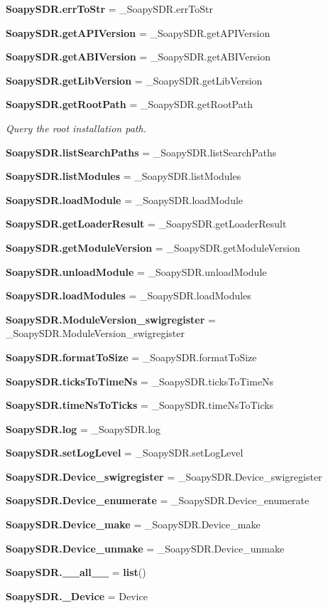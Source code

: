 \begin{DoxyCompactItemize}
{\bf Soapy\+S\+D\+R.\+err\+To\+Str} = \+\_\+\+Soapy\+S\+D\+R.\+err\+To\+Str
\item 
{\bf Soapy\+S\+D\+R.\+get\+A\+P\+I\+Version} = \+\_\+\+Soapy\+S\+D\+R.\+get\+A\+P\+I\+Version
\item 
{\bf Soapy\+S\+D\+R.\+get\+A\+B\+I\+Version} = \+\_\+\+Soapy\+S\+D\+R.\+get\+A\+B\+I\+Version
\item 
{\bf Soapy\+S\+D\+R.\+get\+Lib\+Version} = \+\_\+\+Soapy\+S\+D\+R.\+get\+Lib\+Version
\item 
{\bf Soapy\+S\+D\+R.\+get\+Root\+Path} = \+\_\+\+Soapy\+S\+D\+R.\+get\+Root\+Path
\begin{DoxyCompactList}\small\item\em Query the root installation path. \end{DoxyCompactList}\item 
{\bf Soapy\+S\+D\+R.\+list\+Search\+Paths} = \+\_\+\+Soapy\+S\+D\+R.\+list\+Search\+Paths
\item 
{\bf Soapy\+S\+D\+R.\+list\+Modules} = \+\_\+\+Soapy\+S\+D\+R.\+list\+Modules
\item 
{\bf Soapy\+S\+D\+R.\+load\+Module} = \+\_\+\+Soapy\+S\+D\+R.\+load\+Module
\item 
{\bf Soapy\+S\+D\+R.\+get\+Loader\+Result} = \+\_\+\+Soapy\+S\+D\+R.\+get\+Loader\+Result
\item 
{\bf Soapy\+S\+D\+R.\+get\+Module\+Version} = \+\_\+\+Soapy\+S\+D\+R.\+get\+Module\+Version
\item 
{\bf Soapy\+S\+D\+R.\+unload\+Module} = \+\_\+\+Soapy\+S\+D\+R.\+unload\+Module
\item 
{\bf Soapy\+S\+D\+R.\+load\+Modules} = \+\_\+\+Soapy\+S\+D\+R.\+load\+Modules
\item 
{\bf Soapy\+S\+D\+R.\+Module\+Version\+\_\+swigregister} = \+\_\+\+Soapy\+S\+D\+R.\+Module\+Version\+\_\+swigregister
\item 
{\bf Soapy\+S\+D\+R.\+format\+To\+Size} = \+\_\+\+Soapy\+S\+D\+R.\+format\+To\+Size
\item 
{\bf Soapy\+S\+D\+R.\+ticks\+To\+Time\+Ns} = \+\_\+\+Soapy\+S\+D\+R.\+ticks\+To\+Time\+Ns
\item 
{\bf Soapy\+S\+D\+R.\+time\+Ns\+To\+Ticks} = \+\_\+\+Soapy\+S\+D\+R.\+time\+Ns\+To\+Ticks
\item 
{\bf Soapy\+S\+D\+R.\+log} = \+\_\+\+Soapy\+S\+D\+R.\+log
\item 
{\bf Soapy\+S\+D\+R.\+set\+Log\+Level} = \+\_\+\+Soapy\+S\+D\+R.\+set\+Log\+Level
\item 
{\bf Soapy\+S\+D\+R.\+Device\+\_\+swigregister} = \+\_\+\+Soapy\+S\+D\+R.\+Device\+\_\+swigregister
\item 
{\bf Soapy\+S\+D\+R.\+Device\+\_\+enumerate} = \+\_\+\+Soapy\+S\+D\+R.\+Device\+\_\+enumerate
\item 
{\bf Soapy\+S\+D\+R.\+Device\+\_\+make} = \+\_\+\+Soapy\+S\+D\+R.\+Device\+\_\+make
\item 
{\bf Soapy\+S\+D\+R.\+Device\+\_\+unmake} = \+\_\+\+Soapy\+S\+D\+R.\+Device\+\_\+unmake
\item 
{\bf Soapy\+S\+D\+R.\+\_\+\+\_\+all\+\_\+\+\_\+} = {\bf list}()
\item 
{\bf Soapy\+S\+D\+R.\+\_\+\+Device} = Device
\end{DoxyCompactItemize}
